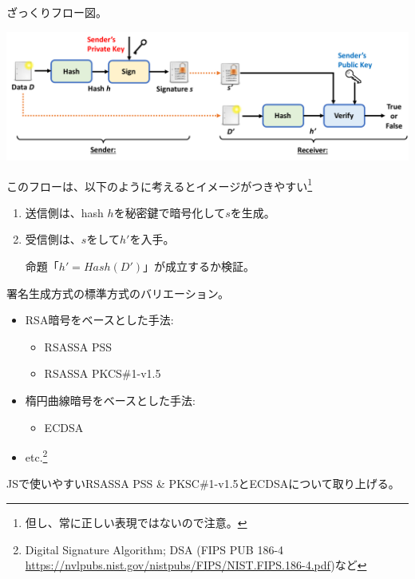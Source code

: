 \documentclass[12pt,dvipdfmx]{beamer}
\begin{document}
\begin{frame}
ざっくりフロー図。
\begin{center}
\includegraphics[width=\linewidth]{Figs/sig-flow02.pdf}
\end{center}
このフローは、以下のように考えるとイメージがつきやすい\footnote[frame]{\scriptsize 但し、常に正しい表現ではないので注意。}
\begin{enumerate}
 \item 送信側は、hash $h$を\alert{秘密鍵で暗号化}して$s$を生成。
 \item 受信側は、$s$をして$h'$を入手。

命題「$h' = \mathit{Hash}(D')$」が成立するか検証。
\end{enumerate}
\end{frame}

\begin{frame}
署名生成方式の標準方式のバリエーション。
\begin{itemize}
\item RSA暗号をベースとした手法:
\begin{itemize}
 \item RSASSA PSS
 \item RSASSA PKCS\#1-v1.5
\end{itemize}
\item 楕円曲線暗号をベースとした手法:
\begin{itemize}
 \item ECDSA
\end{itemize}
\item etc.\footnote[frame]{\scriptsize Digital Signature Algorithm; DSA (FIPS PUB 186-4 \url{https://nvlpubs.nist.gov/nistpubs/FIPS/NIST.FIPS.186-4.pdf})など}
\end{itemize}
JSで使いやすいRSASSA PSS \& PKSC\#1-v1.5とECDSAについて取り上げる。
\end{frame}
\end{document}

